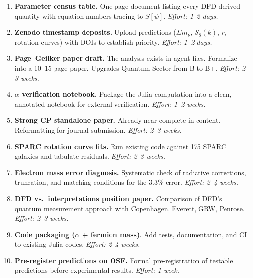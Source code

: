 \documentclass[11pt,a4paper]{article}
\begin{document}
\begin{enumerate}
    \item \textcolor{quickwin}{\textbf{Parameter census table.}} One-page document listing every DFD-derived quantity with equation numbers tracing to $S[\psi]$. \emph{Effort: 1--2 days.}

    \item \textcolor{quickwin}{\textbf{Zenodo timestamp deposits.}} Upload predictions ($\Sigma m_\nu$, $S_8(k)$, $r$, rotation curves) with DOIs to establish priority. \emph{Effort: 1--2 days.}

    \item \textcolor{quickwin}{\textbf{Page--Geilker paper draft.}} The analysis exists in agent files. Formalize into a 10--15 page paper. Upgrades Quantum Sector from B to B+. \emph{Effort: 2--3 weeks.}

    \item \textcolor{quickwin}{\textbf{$\alpha$ verification notebook.}} Package the Julia computation into a clean, annotated notebook for external verification. \emph{Effort: 1--2 weeks.}

    \item \textcolor{quickwin}{\textbf{Strong CP standalone paper.}} Already near-complete in content. Reformatting for journal submission. \emph{Effort: 2--3 weeks.}

    \item \textcolor{quickwin}{\textbf{SPARC rotation curve fits.}} Run existing code against 175 SPARC galaxies and tabulate residuals. \emph{Effort: 2--3 weeks.}

    \item \textcolor{quickwin}{\textbf{Electron mass error diagnosis.}} Systematic check of radiative corrections, truncation, and matching conditions for the 3.3\% error. \emph{Effort: 2--4 weeks.}

    \item \textcolor{quickwin}{\textbf{DFD vs.\ interpretations position paper.}} Comparison of DFD's quantum measurement approach with Copenhagen, Everett, GRW, Penrose. \emph{Effort: 2--3 weeks.}

    \item \textcolor{quickwin}{\textbf{Code packaging ($\alpha$ + fermion mass).}} Add tests, documentation, and CI to existing Julia codes. \emph{Effort: 2--4 weeks.}

    \item \textcolor{quickwin}{\textbf{Pre-register predictions on OSF.}} Formal pre-registration of testable predictions before experimental results. \emph{Effort: 1 week.}
\end{enumerate}
\end{document}
